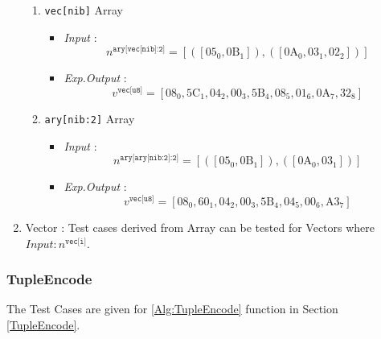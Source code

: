 \documentclass[../alan-handbook.tex]{subfiles}
\begin{document}
\begin{enumerate}
\begin{enumerate}
            \item \texttt{vec[nib]} Array
                \begin{itemize}
                    \item \textit{Input} : $$n^{\texttt{ary[vec[nib]:2]}} = [([\text{05}_0,\text{0B}_1]),([\text{0A}_0,\text{03}_1,\text{02}_2])]$$
                    \item \textit{Exp.Output} : $$v^{\texttt{vec[u8]}} = [\text{08}_0,\text{5C}_1,\text{04}_2,\text{00}_3,\text{5B}_4,\text{08}_5,\text{01}_6,\text{0A}_7,\text{32}_8]$$
                \end{itemize}
            \item \texttt{ary[nib:2]} Array
                \begin{itemize}
                    \item \textit{Input} : $$n^{\texttt{ary[ary[nib:2]:2]}} = [([\text{05}_0,\text{0B}_1]),([\text{0A}_0,\text{03}_1])]$$
                    \item \textit{Exp.Output} : $$v^{\texttt{vec[u8]}} = [\text{08}_0,\text{60}_1,\text{04}_2,\text{00}_3,\text{5B}_4,\text{04}_5,\text{00}_6,\text{A3}_7]$$
                \end{itemize}
        \end{enumerate}
    \item Vector : Test cases derived from Array can be tested for Vectors where $\textit{Input} : n^{\texttt{vec[i]}}$.
\end{enumerate}

\subsubsection{TupleEncode} \label{Test:TupleEncode}

The Test Cases are given for  \ref{Alg:TupleEncode} function in Section \ref{TupleEncode}.
\end{document}
